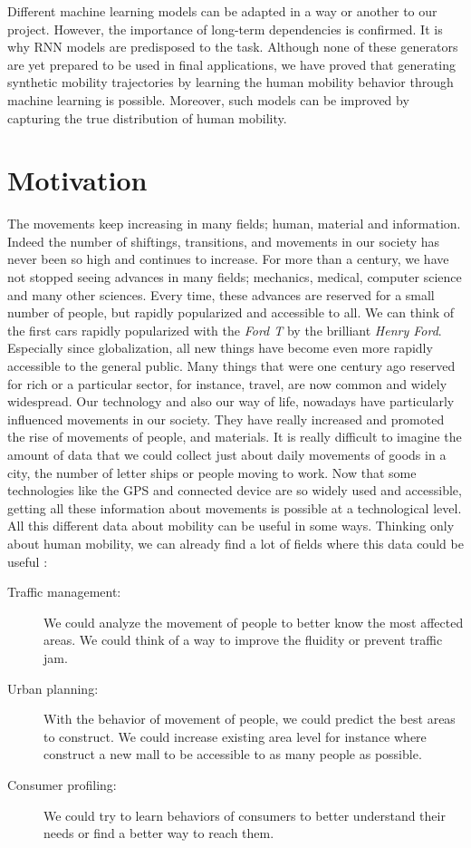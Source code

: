 \documentclass[a4]{article}
\begin{document}
Different machine learning models can be adapted in a way or another to our project. However, the importance of long-term dependencies is confirmed. It is why RNN models are predisposed to the task. Although none of these generators are yet prepared to be used in final applications, we have proved that generating synthetic mobility trajectories by learning the human mobility behavior through machine learning is possible. Moreover, such models can be improved by capturing the true distribution of human mobility.

\newpage
\section{Motivation}%
The movements keep increasing in many fields; human, material and information. Indeed the number of shiftings, transitions, and movements in our society has never been so high and continues to increase. For more than a century, we have not stopped seeing advances in many fields; mechanics, medical, computer science and many other sciences. Every time, these advances are reserved for a small number of people, but rapidly popularized and accessible to all. We can think of the first cars rapidly popularized with the \textit{Ford T} by the brilliant \textit{Henry Ford}.
Especially since globalization, all new things have become even more rapidly accessible to the general public. Many things that were one century ago reserved for rich or a particular sector, for instance, travel, are now common and widely widespread. Our technology and also our way of life, nowadays have particularly influenced movements in our society. They have really increased and promoted the rise of movements of people, and materials. It is really difficult to imagine the amount of data that we could collect just about daily movements of goods in a city, the number of letter ships or people moving to work. Now that some technologies like the GPS and connected device are so widely used and accessible, getting all these information about movements is possible at a technological level. All this different data about mobility can be useful in some ways. Thinking only about human mobility, we can already find a lot of fields where this data could be useful \cite{kulkarni}: 
\begin{description}
  \item [Traffic management:] We could analyze the movement of people to better know the most affected areas. We could think of a way to improve the fluidity or prevent traffic jam.
  \item [Urban planning:] With the behavior of movement of people, we could predict the best areas to construct. We could increase existing area level for instance where construct a new mall to be accessible to as many people as possible.
  \item [Consumer profiling:] We could try to learn behaviors of consumers to better understand their needs or find a better way to reach them.
\end{description}
\end{document}
